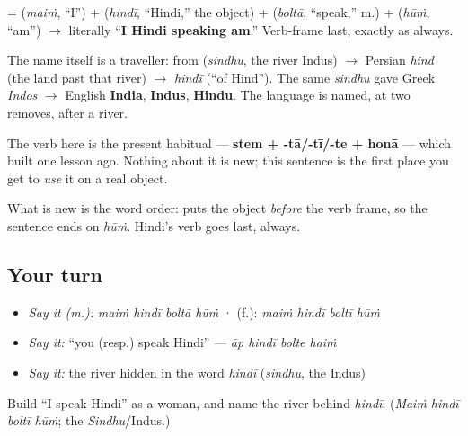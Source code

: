 \begin{cousinweb}
\textbf{   } = \textbf{} (\emph{maiṁ}, \textquotedblleft{}I\textquotedblright{}) + \textbf{} (\emph{hindī}, \textquotedblleft{}Hindi,\textquotedblright{} the object) + \textbf{} (\emph{boltā}, \textquotedblleft{}speak,\textquotedblright{} m.) + \textbf{} (\emph{hūṁ}, \textquotedblleft{}am\textquotedblright{}) $\to$ literally \textquotedblleft{}\textbf{I Hindi speaking am}.\textquotedblright{} Verb-frame last, exactly as always.

The name \textbf{} itself is a traveller: from \textbf{} (\emph{sindhu}, the river Indus) $\to$ Persian \emph{hind} (the land past that river) $\to$ \emph{hindī} (\textquotedblleft{}of Hind\textquotedblright{}). The same \emph{sindhu} gave Greek \emph{Indos} $\to$ English \textbf{India}, \textbf{Indus}, \textbf{Hindu}. The language is named, at two removes, after a river.
\end{cousinweb}

\begin{grammarlens}[title={Grammar Lens: the frame you already have}]
The verb here is the present habitual — \textbf{stem + -tā/-tī/-te + honā} — which   built one lesson ago. Nothing about it is new; this sentence is the first place you get to \emph{use} it on a real object.

What is new is the word order: \textbf{   } puts the object \emph{before} the verb frame, so the sentence ends on \emph{hūṁ}. Hindi's verb goes last, always.
\end{grammarlens}

\subsection*{Your turn}
\begin{itemize}
\raggedright
  \item \emph{Say it (m.):} \emph{maiṁ hindī boltā hūṁ}  ·  (f.): \emph{maiṁ hindī boltī hūṁ}
  \item \emph{Say it:} \textquotedblleft{}you (resp.) speak Hindi\textquotedblright{} — \emph{āp hindī bolte haiṁ}
  \item \emph{Say it:} the river hidden in the word \emph{hindī} (\emph{sindhu}, the Indus)
\end{itemize}

\begin{tcolorbox}[breakable,colback=teal!4,colframe=teal!35!black,title={Before you move on}]
Build \textquotedblleft{}I speak Hindi\textquotedblright{} as a woman, and name the river behind \emph{hindī}. (\emph{Maiṁ hindī boltī hūṁ}; the \emph{Sindhu}/Indus.)
\end{tcolorbox}
